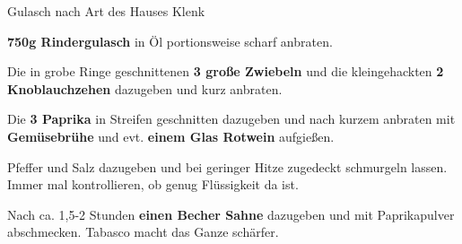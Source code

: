 \begin{recipe}[]{Gulasch nach Art des Hauses Klenk}
	
\step
\textbf{750g Rindergulasch} in Öl portionsweise scharf anbraten.

\step
Die in grobe Ringe geschnittenen \textbf{3 große Zwiebeln} und die kleingehackten \textbf{2 Knoblauchzehen} dazugeben und kurz anbraten.

\step
Die \textbf{3 Paprika} in Streifen geschnitten dazugeben und nach kurzem anbraten mit \textbf{Gemüsebrühe} und evt. \textbf{einem Glas Rotwein} aufgießen.

\step
Pfeffer und Salz dazugeben und bei geringer Hitze zugedeckt schmurgeln lassen. Immer mal kontrollieren, ob genug Flüssigkeit da ist.

\step
Nach ca. 1,5-2 Stunden \textbf{einen Becher Sahne} dazugeben und mit Paprikapulver abschmecken. Tabasco macht das Ganze schärfer.





\end{recipe}